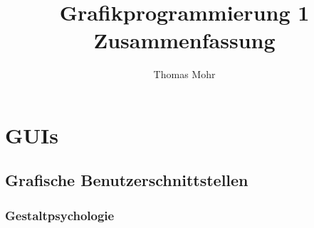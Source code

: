 \documentclass{scrartcl}
\title{Grafikprogrammierung 1 \\ Zusammenfassung}
\author{Thomas Mohr}
\date{}
\begin{document}
\maketitle
\pagebreak
\tableofcontents{}

\section{GUIs}

\subsection{Grafische Benutzerschnittstellen}

\subsubsection{Gestaltpsychologie}
\end{document}
